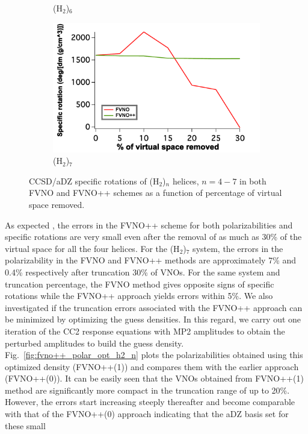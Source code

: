 \begin{figure}
\begin{subfigure}{.5\textwidth}
  \caption{(H$_2$)$_6$}
  \label{fig:sfig2}
\end{subfigure}
\begin{subfigure}{.5\textwidth}
  \centering
  \includegraphics[width=.9\linewidth]{figures_fvno++/fvno++_h2_7_adz_optrot_lg.pdf}
  \caption{(H$_2$)$_7$}
  \label{fig:sfig2}
\end{subfigure}
\caption{{\footnotesize CCSD/aDZ  specific rotations of
(H$_2$)$_n$ helices, $ n = 4-7$ in both FVNO and FVNO++ schemes as a function of
percentage of virtual space removed.}}
\label{fig:fvno++_optrot_h2_n}
\end{figure}
As expected , the errors in the FVNO++ scheme for both polarizabilities and specific rotations are
very small even after the removal of as much as 30\% of the virtual space for all the four helices.
For the (H$_2$)$_7$ system, the errors in the polarizability in the FVNO and FVNO++ methods are 
approximately 7\% and 0.4\% respectively after truncation 30\% of VNOs. For the same system and truncation
percentage, the FVNO method gives opposite signs of specific rotations while the FVNO++ approach 
yields errors within 5\%. We also investigated if the truncation errors associated with the 
FVNO++ approach can be minimized by optimizing the guess densities. In this regard, we carry out 
one iteration of the CC2 response equations with MP2 amplitudes to obtain the perturbed amplitudes
to build the guess density. Fig.~\ref{fig:fvno++_polar_opt_h2_n} plots the polarizabilities 
obtained using this optimized density (FVNO++(1)) and compares them with the earlier approach (FVNO++(0)).
It can be easily seen that the VNOs obtained from FVNO++(1) method are significantly more 
compact in the truncation range of up to 20\%. However, the errors start increasing steeply thereafter
and become comparable with that of the FVNO++(0) approach indicating that the aDZ basis set for these small 
